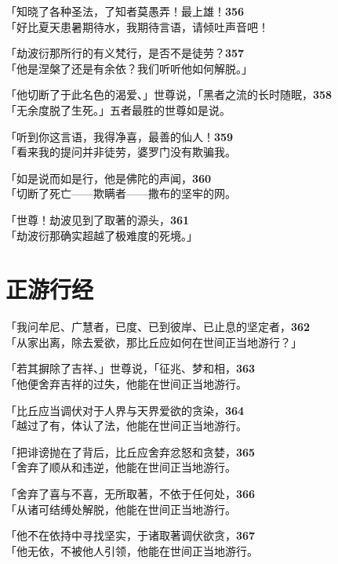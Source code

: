 「知晓了各种圣法，了知者莫愚弄！最上雄！\hfill{\grayfootnotesize \textbf{356}} \\
「好比夏天患暑期待水，我期待言语，请倾吐声音吧！


「劫波衍那所行的有义梵行，是否不是徒劳？\hfill{\grayfootnotesize \textbf{357}} \\
「他是涅槃了还是有余依？我们听听他如何解脱。」


「他切断了于此名色的渴爱、」世尊说，「黑者之流的长时随眠，\hfill{\grayfootnotesize \textbf{358}} \\
「无余度脱了生死。」五者最胜的世尊如是说。


「听到你这言语，我得净喜，最善的仙人！\hfill{\grayfootnotesize \textbf{359}} \\
「看来我的提问并非徒劳，婆罗门没有欺骗我。


「如是说而如是行，他是佛陀的声闻，\hfill{\grayfootnotesize \textbf{360}} \\
「切断了死亡——欺瞒者——撒布的坚牢的网。


「世尊！劫波见到了取著的源头，\hfill{\grayfootnotesize \textbf{361}} \\
「劫波衍那确实超越了极难度的死境。」


\section{正游行经}


「我问牟尼、广慧者，已度、已到彼岸、已止息的坚定者，\hfill{\grayfootnotesize \textbf{362}} \\
「从家出离，除去爱欲，那比丘应如何在世间正当地游行？」


「若其摒除了吉祥、」世尊说，「征兆、梦和相，\hfill{\grayfootnotesize \textbf{363}} \\
「他便舍弃吉祥的过失，他能在世间正当地游行。


「比丘应当调伏对于人界与天界爱欲的贪染，\hfill{\grayfootnotesize \textbf{364}} \\
「越过了有，体认了法，他能在世间正当地游行。


「把诽谤抛在了背后，比丘应舍弃忿怒和贪婪，\hfill{\grayfootnotesize \textbf{365}} \\
「舍弃了顺从和违逆，他能在世间正当地游行。


「舍弃了喜与不喜，无所取著，不依于任何处，\hfill{\grayfootnotesize \textbf{366}} \\
「从诸可结缚处解脱，他能在世间正当地游行。


「他不在依持中寻找坚实，于诸取著调伏欲贪，\hfill{\grayfootnotesize \textbf{367}} \\
「他无依，不被他人引领，他能在世间正当地游行。


